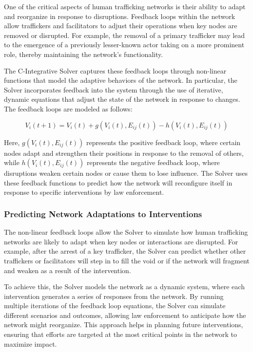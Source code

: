 \documentclass[%
 preprint, linenumbers,
 amsmath,amssymb,
 aps, physrev,
]{revtex4-2}
\begin{document}
One of the critical aspects of human trafficking networks is their ability to adapt and reorganize in response to disruptions. Feedback loops within the network allow traffickers and facilitators to adjust their operations when key nodes are removed or disrupted. For example, the removal of a primary trafficker may lead to the emergence of a previously lesser-known actor taking on a more prominent role, thereby maintaining the network’s functionality.

The C-Integrative Solver captures these feedback loops through non-linear functions that model the adaptive behaviors of the network. In particular, the Solver incorporates feedback into the system through the use of iterative, dynamic equations that adjust the state of the network in response to changes. The feedback loops are modeled as follows:

\[
V_i(t+1) = V_i(t) + g(V_i(t), E_{ij}(t)) - h(V_i(t), E_{ij}(t))
\]

Here, \( g(V_i(t), E_{ij}(t)) \) represents the positive feedback loop, where certain nodes adapt and strengthen their positions in response to the removal of others, while \( h(V_i(t), E_{ij}(t)) \) represents the negative feedback loop, where disruptions weaken certain nodes or cause them to lose influence. The Solver uses these feedback functions to predict how the network will reconfigure itself in response to specific interventions by law enforcement.

\subsubsection{Predicting Network Adaptations to Interventions}

The non-linear feedback loops allow the Solver to simulate how human trafficking networks are likely to adapt when key nodes or interactions are disrupted. For example, after the arrest of a key trafficker, the Solver can predict whether other traffickers or facilitators will step in to fill the void or if the network will fragment and weaken as a result of the intervention.

To achieve this, the Solver models the network as a dynamic system, where each intervention generates a series of responses from the network. By running multiple iterations of the feedback loop equations, the Solver can simulate different scenarios and outcomes, allowing law enforcement to anticipate how the network might reorganize. This approach helps in planning future interventions, ensuring that efforts are targeted at the most critical points in the network to maximize impact.
\end{document}
